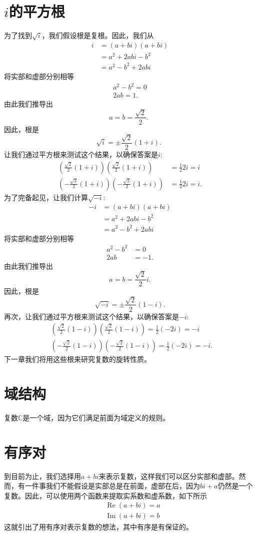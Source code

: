 \section{$i$的平方根}
为了找到$\sqrt{i}$，我们假设根是复根。因此，我们从
$$
\begin{aligned}
i & =(a+b i)(a+b i) \\
& =a^{2}+2 a b i-b^{2} \\
& =a^{2}-b^{2}+2 a b i
\end{aligned}
$$
将实部和虚部分别相等
$$
\begin{array}{r}
a^{2}-b^{2}=0 \\
2 a b=1 .
\end{array}
$$
由此我们推导出
$$
a=b=\frac{\sqrt{2}}{2} \text {. }
$$
因此，根是
$$
\sqrt{i}=\pm \frac{\sqrt{2}}{2}(1+i) \text {. }
$$
让我们通过平方根来测试这个结果，以确保答案是$i$:
$$
\begin{aligned}
\left(\frac{\sqrt{2}}{2}(1+i)\right)\left(\frac{\sqrt{2}}{2}(1+i)\right) & =\frac{1}{2} 2 i=i \\
\left(-\frac{\sqrt{2}}{2}(1+i)\right)\left(-\frac{\sqrt{2}}{2}(1+i)\right) & =\frac{1}{2} 2 i=i .
\end{aligned}
$$
为了完备起见，让我们计算$\sqrt{-i}$:
$$
\begin{aligned}
-i & =(a+b i)(a+b i) \\
& =a^{2}+2 a b i-b^{2} \\
& =a^{2}-b^{2}+2 a b i
\end{aligned}
$$
将实部和虚部分别相等
$$
\begin{aligned}
a^{2}-b^{2} & =0 \\
2 a b & =-1 .
\end{aligned}
$$
由此我们推导出
$$
a=b=\frac{\sqrt{2}}{2} i .
$$
因此，根是
$$
\sqrt{-i}=\pm \frac{\sqrt{2}}{2}(1-i) .
$$
再次，让我们通过平方根来测试这个结果，以确保答案是$-i$:
$$
\begin{aligned}
& \left(\frac{\sqrt{2}}{2}(1-i)\right)\left(\frac{\sqrt{2}}{2}(1-i)\right)=\frac{1}{2}(-2 i)=-i \\
& \left(-\frac{\sqrt{2}}{2}(1-i)\right)\left(-\frac{\sqrt{2}}{2}(1-i)\right)=\frac{1}{2}(-2 i)=-i \text {. }
\end{aligned}
$$
下一章我们将用这些根来研究复数的旋转性质。
\section{域结构}
复数$\mathbb{C}$是一个域，因为它们满足前面为域定义的规则。

\section{有序对}
到目前为止，我们选择用$a+ bi $来表示复数，这样我们可以区分实部和虚部。然而，有一件事我们不能假设是实部总是在前面，虚部在后，因为$b i+a$仍然是一个复数。因此，可以使用两个函数来提取实系数和虚系数，如下所示
$$
\begin{aligned}
& \operatorname{Re}(a+b i)=a \\
& \operatorname{Im}(a+b i)=b
\end{aligned}
$$
这就引出了用有序对表示复数的想法，其中有序是有保证的。

